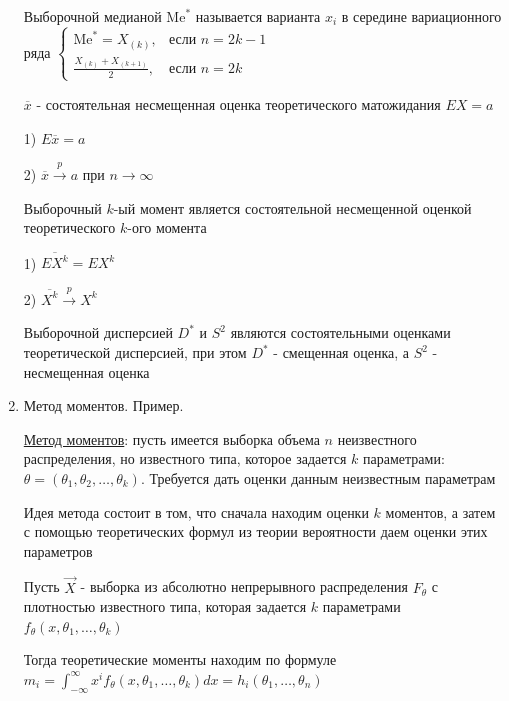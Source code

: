 \documentclass[12pt]{article}
\begin{document}
\begin{enumerate}
    \Defs Выборочной медианой $\mathrm{Me}^*$ называется варианта $x_i$ в середине вариационного ряда $\begin{cases}\mathrm{Me}^* = 
    X_{(k)}, & \text{если } n = 2k - 1 \\ \frac{X_{(k)} + X_{(k + 1)}}{2}, & \text{если } n = 2k\end{cases}$
    
    \begin{MyTheorem}
        \Ths $\overline{x}$ - состоятельная несмещенная оценка теоретического матожидания $EX = a$
    
        1) $E \overline{x} = a$
    
        2) $\overline{x} \overset{p}{\longrightarrow} a$ при $n \to \infty$
    \end{MyTheorem}
    
    \begin{MyTheorem}
        \Ths Выборочный $k$-ый момент является состоятельной несмещенной оценкой теоретического $k$-ого момента
    
        1) $\overline{E X^k} = E X^k$
    
        2) $\overline{X^k} \overset{p}{\longrightarrow} X^k$
    \end{MyTheorem}
    
    \begin{MyTheorem}
        \Ths Выборочной дисперсией $D^*$ и $S^2$ являются состоятельными оценками теоретической дисперсией, при этом $D^*$ - смещенная оценка, а $S^2$ - несмещенная оценка
    \end{MyTheorem}

    \item Метод моментов. Пример.

    \hyperlink{method_of_moments}{Метод моментов}: пусть имеется выборка объема $n$ неизвестного распределения, но известного типа,
    которое задается $k$ параметрами: $\theta = (\theta_1, \theta_2, \dots, \theta_k)$. Требуется дать оценки данным
    неизвестным параметрам

    Идея метода состоит в том, что сначала находим оценки $k$ моментов, а затем с помощью теоретических формул
    из теории вероятности даем оценки этих параметров

    Пусть $\vec{X}$ - выборка из абсолютно непрерывного распределения $F_\theta$ с плотностью известного типа, 
    которая задается $k$ параметрами $f_\theta (x, \theta_1, \dots, \theta_k)$

    Тогда теоретические моменты находим по формуле $m_i = \int_{-\infty}^{\infty} x^i f_\theta (x, \theta_1, \dots, \theta_k) dx = h_i(\theta_1, \dots, \theta_n)$


\end{enumerate}
\end{document}
